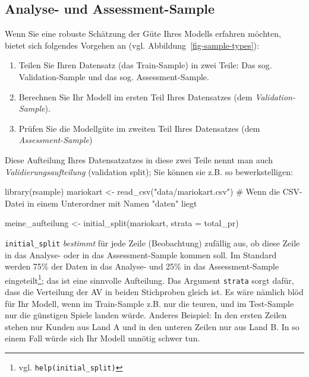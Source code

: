 \documentclass[
  letterpaper,
  oneside,
  open=any]{scrbook}
\newenvironment{Shaded}{\begin{snugshade}}{\end{snugshade}}
\newcommand{\AttributeTok}[1]{\textcolor[rgb]{0.40,0.45,0.13}{#1}}
\newcommand{\CommentTok}[1]{\textcolor[rgb]{0.37,0.37,0.37}{#1}}
\newcommand{\FunctionTok}[1]{\textcolor[rgb]{0.28,0.35,0.67}{#1}}
\newcommand{\NormalTok}[1]{\textcolor[rgb]{0.00,0.23,0.31}{#1}}
\newcommand{\OtherTok}[1]{\textcolor[rgb]{0.00,0.23,0.31}{#1}}
\newcommand{\StringTok}[1]{\textcolor[rgb]{0.13,0.47,0.30}{#1}}
\providecommand{\tightlist}{%
  \setlength{\itemsep}{0pt}\setlength{\parskip}{0pt}}\usepackage{longtable,booktabs,array}
\theoremstyle{definition}
\theoremstyle{definition}
\theoremstyle{definition}
\theoremstyle{remark}
\begin{document}
\subsection{Analyse- und
Assessment-Sample}\label{analyse--und-assessment-sample}

Wenn Sie eine robuste Schätzung der Güte Ihres Modells erfahren möchten,
bietet sich folgendes Vorgehen an (vgl.
Abbildung~\ref{fig-sample-types}):

\begin{enumerate}
\def\labelenumi{\arabic{enumi}.}
\tightlist
\item
  Teilen Sie Ihren Datensatz (das Train-Sample) in zwei Teile: Das sog.
  Validation-Sample und das sog. Assessment-Sample.
\item
  Berechnen Sie Ihr Modell im ersten Teil Ihres Datensatzes (dem
  \emph{Validation-Sample}).
\item
  Prüfen Sie die Modellgüte im zweiten Teil Ihres Datensatzes (dem
  \emph{Assessment-Sample})
\end{enumerate}

Diese Aufteilung Ihres Datensatzatzes in diese zwei Teile nennt man auch
\emph{Validierungsaufteilung} (validation split); Sie können sie z.B. so
bewerkstelligen:

\begin{Shaded}
\begin{Highlighting}[]
\FunctionTok{library}\NormalTok{(rsample)}
\NormalTok{mariokart }\OtherTok{\textless{}{-}} \FunctionTok{read\_csv}\NormalTok{(}\StringTok{"data/mariokart.csv"}\NormalTok{)  }\CommentTok{\# Wenn die CSV{-}Datei in einem Unterordner mit Namen "daten" liegt}

\NormalTok{meine\_aufteilung }\OtherTok{\textless{}{-}} \FunctionTok{initial\_split}\NormalTok{(mariokart, }\AttributeTok{strata =}\NormalTok{ total\_pr)}
\end{Highlighting}
\end{Shaded}

\texttt{initial\_split} \emph{bestimmt} für jede Zeile (Beobachtung)
zufällig aus, ob diese Zeile in das Analyse- oder in das
Assessment-Sample kommen soll. Im Standard werden 75\% der Daten in das
Analyse- und 25\% in das Assessment-Sample eingeteilt\footnote{vgl.
  \texttt{help(initial\_split)}}; das ist eine sinnvolle Aufteilung. Das
Argument \texttt{strata} sorgt dafür, dass die Verteilung der AV in
beiden Stichproben gleich ist. Es wäre nämlich blöd für Ihr Modell, wenn
im Train-Sample z.B. nur die teuren, und im Test-Sample nur die
günstigen Spiele landen würde. Anderes Beispiel: In den ersten Zeilen
stehen nur Kunden aus Land A und in den unteren Zeilen nur aus Land B.
In so einem Fall würde sich Ihr Modell unnötig schwer tun.
\end{document}

